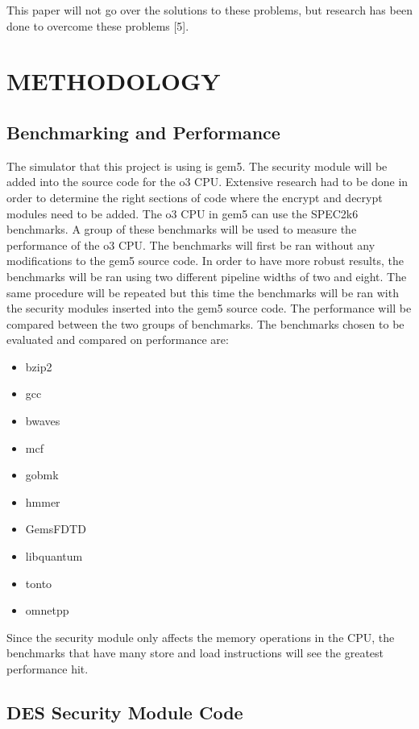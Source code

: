 \documentclass[letterpaper, 10pt, conference]{ieeeconf}  %
\begin{document}
This paper will not go over the solutions to these problems, but research has been done to overcome these problems [5].  

\section{METHODOLOGY}

\subsection{Benchmarking and Performance}

The simulator that this project is using is gem5. The security module will be added into the source code for the o3 CPU. Extensive research had to be done in order to determine the right sections of code where the encrypt and decrypt modules need to be added.  The o3 CPU in gem5 can use the SPEC2k6 benchmarks.  A group of these benchmarks will be used to measure the performance of the o3 CPU.  The benchmarks will first be ran without any modifications to the gem5 source code.  In order to have more robust results, the benchmarks will be ran using two different pipeline widths of two and eight.  The same procedure will be repeated but this time the benchmarks will be ran with the security modules inserted into the gem5 source code. The performance will be compared between the two groups of benchmarks.  The benchmarks chosen to be evaluated and compared on performance are:

\begin{multicols}{2}
\begin{itemize}
\item bzip2
\item gcc
\item bwaves
\item mcf
\item gobmk
\item hmmer
\item GemsFDTD
\item libquantum
\item tonto
\item omnetpp
\end{itemize}
\end{multicols}

Since the security module only affects the memory operations in the CPU, the benchmarks that have many store and load instructions will see the greatest performance hit.

\subsection{DES Security Module Code}
\end{document}
